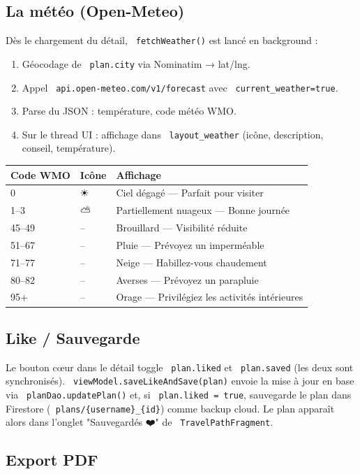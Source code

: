 \documentclass[a4paper,12pt,openany]{report}
\newcommand{\ic}[1]{\texttt{\small\colorbox{lightbg}{\color{navy!90} #1}}}
\begin{document}
\subsection{La météo (Open-Meteo)}

Dès le chargement du détail, \ic{fetchWeather()} est lancé en background :
\begin{enumerate}
  \item Géocodage de \ic{plan.city} via Nominatim → lat/lng.
  \item Appel \ic{api.open-meteo.com/v1/forecast} avec \ic{current\_weather=true}.
  \item Parse du JSON : température, code météo WMO.
  \item Sur le thread UI : affichage dans \ic{layout\_weather} (icône,
    description, conseil, température).
\end{enumerate}

\begin{tabularx}{\textwidth}{l l X}
  \toprule
  Code WMO & Icône & Affichage \\
  \midrule
  0     & ☀  & Ciel dégagé — Parfait pour visiter \\
  1--3  & ⛅  & Partiellement nuageux — Bonne journée \\
  45--49 & -- & Brouillard — Visibilité réduite \\
  51--67 & -- & Pluie — Prévoyez un imperméable \\
  71--77 & -- & Neige — Habillez-vous chaudement \\
  80--82 & -- & Averses — Prévoyez un parapluie \\
  95+   & -- & Orage — Privilégiez les activités intérieures \\
  \bottomrule
\end{tabularx}

\subsection{Like / Sauvegarde}

Le bouton cœur dans le détail toggle \ic{plan.liked} et \ic{plan.saved}
(les deux sont synchronisés). \ic{viewModel.saveLikeAndSave(plan)} envoie
la mise à jour en base via \ic{planDao.updatePlan()} et, si \ic{plan.liked = true},
sauvegarde le plan dans Firestore (\ic{plans/\{username\}\_\{id\}}) comme backup cloud.
Le plan apparaît alors dans l'onglet "Sauvegardés ❤️" de \ic{TravelPathFragment}.

\subsection{Export PDF}
\end{document}
